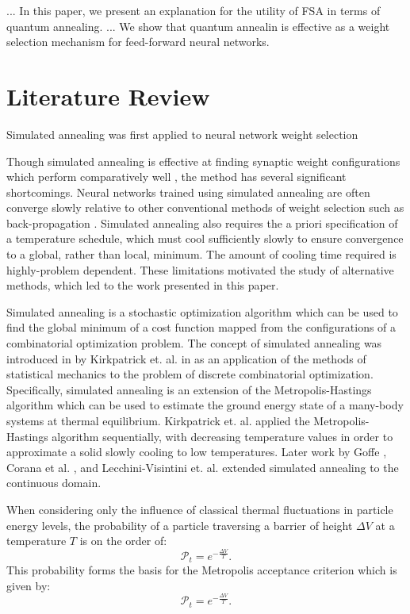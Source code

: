 \documentclass[10pt,journal,cspaper,compsoc]{IEEEtran}
\begin{document}
... In this paper, we present an explanation for the utility of FSA in terms of quantum annealing.
... We show that quantum annealin is effective as a weight selection mechanism for feed-forward neural networks.
 
\section{Literature Review}
\label{scn:lit_review}
Simulated annealing was first applied to neural network weight selection 


Though simulated annealing is effective at finding synaptic weight configurations which perform comparatively well \cite{}, the method has several significant shortcomings. Neural networks trained using simulated annealing are often converge slowly relative to other conventional methods of weight selection such as back-propagation \cite{}. Simulated annealing also requires the a priori specification of a temperature schedule, which must cool sufficiently slowly to ensure convergence to a global, rather than local, minimum. The amount of cooling time required is highly-problem dependent. These limitations motivated the study of alternative methods, which led to the work presented in this paper.


Simulated annealing is a stochastic optimization algorithm which can be used to find the global minimum of a cost function mapped from the configurations of a combinatorial optimization problem. The concept of simulated annealing was introduced in by Kirkpatrick et. al. in \cite{kirkpatrick1983} as an application of the methods of statistical mechanics to the problem of discrete combinatorial optimization. Specifically, simulated annealing is an extension of the Metropolis-Hastings \cite{metropolis1953} algorithm which can be used to estimate the ground energy state of a many-body systems at thermal equilibrium. Kirkpatrick et. al. applied the Metropolis-Hastings algorithm sequentially, with decreasing temperature values in order to approximate a solid slowly cooling to low temperatures. Later work by Goffe \cite{goffe1994globaloptimization}, Corana et al. \cite{corana1987minimizingmultimodal}, and Lecchini-Visintini et. al. \cite{lecchinivisintini2007sacontinuousgaruntees} extended simulated annealing to the continuous domain. 

When considering only the influence of classical thermal fluctuations in particle energy levels, the probability of a particle traversing a barrier of height \begin{math} \Delta V \end{math} at a temperature \begin{math} T \end{math} is on the order of: \begin{equation} \label{eq:thermal_transistion_prob}
\mathcal{P}_t = e^{-\frac{\Delta V}{T}}.
\end{equation}
This probability forms the basis for the Metropolis acceptance criterion which is given by: \begin{equation} \label{eq:metropolis_acceptance}
\mathcal{P}_t = e^{-\frac{\Delta V}{T}}.
\end{equation}
\end{document}
